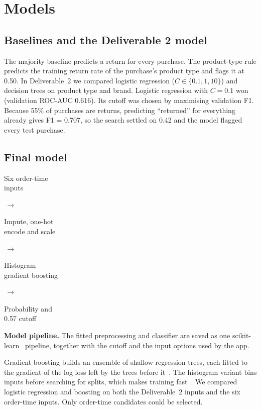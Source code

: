 \documentclass[11pt,a4paper]{article}
\newcommand{\stage}[1]{\colorbox{wash}{\parbox[c][14mm][c]{.20\linewidth}{\centering\small #1}}}
\begin{document}
\section{Models}
\subsection{Baselines and the Deliverable 2 model}
The majority baseline predicts a return for every purchase. The product-type rule predicts the training return rate of the purchase's product type and flags it at 0.50. In Deliverable~2 we compared logistic regression (\(C \in \{0.1, 1, 10\}\)) and decision trees on product type and brand. Logistic regression with \(C=0.1\) won (validation ROC-AUC 0.616). Its cutoff was chosen by maximising validation F1. Because 55\% of purchases are returns, predicting ``returned'' for everything already gives F1 = 0.707, so the search settled on 0.42 and the model flagged every test purchase.

\subsection{Final model}
\begin{center}
\stage{Six order-time\\inputs}\(\,\to\,\)\stage{Impute, one-hot\\encode and scale}\(\,\to\,\)\stage{Histogram\\gradient boosting}\(\,\to\,\)\stage{Probability and\\0.57 cutoff}
\end{center}
{\small\textbf{Model pipeline.} The fitted preprocessing and classifier are saved as one scikit-learn~\cite{sklearn} pipeline, together with the cutoff and the input options used by the app.}

Gradient boosting builds an ensemble of shallow regression trees, each fitted to the gradient of the log loss left by the trees before it~\cite{friedman}. The histogram variant bins inputs before searching for splits, which makes training fast~\cite{lightgbm}. We compared logistic regression and boosting on both the Deliverable~2 inputs and the six order-time inputs. Only order-time candidates could be selected.
\end{document}
